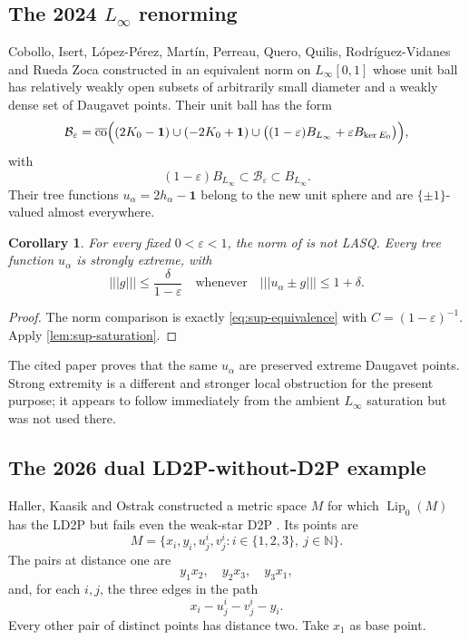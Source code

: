 \documentclass[11pt]{article}
\newtheorem{corollary}[theorem]{Corollary}
\newcommand{\N}{\mathbb N}
\newcommand{\eps}{\varepsilon}
\newcommand{\Lip}{\operatorname{Lip}}
\newcommand{\clco}{\overline{\operatorname{co}}}
\newcommand{\newnorm}[1]{\left\lvert\!\left\lvert\!\left\lvert #1\right\rvert\!\right\rvert\!\right\rvert}
\begin{document}
\subsection{The 2024 $L_\infty$ renorming}

Cobollo, Isert, L\'opez-P\'erez, Mart\'in, Perreau, Quero, Quilis, Rodr\'iguez-Vidanes and Rueda Zoca constructed in \cite{CobolloEtAl2024} an equivalent norm on $L_\infty[0,1]$ whose unit ball has relatively weakly open subsets of arbitrarily small diameter and a weakly dense set of Daugavet points.  Their unit ball has the form
\[
 \mathcal B_\eps=\clco\Bigl(
 (2K_0-\mathbf1)\cup(-2K_0+\mathbf1)
 \cup\bigl((1-\eps)B_{L_\infty}+\eps B_{\ker E_0}\bigr)
 \Bigr),
\]
with
\[
 (1-\eps)B_{L_\infty}\subset\mathcal B_\eps\subset B_{L_\infty}.
\]
Their tree functions $u_\alpha=2h_\alpha-\mathbf1$ belong to the new unit sphere and are $\{\pm1\}$-valued almost everywhere.

\begin{corollary}
\label{cor:cobollo-not-lasq}
For every fixed $0<\eps<1$, the norm of \cite[Theorem~1.3]{CobolloEtAl2024} is not LASQ.  Every tree function $u_\alpha$ is strongly extreme, with
\[
 \newnorm{g}\le\frac{\delta}{1-\eps}
 \quad\text{whenever}\quad
 \newnorm{u_\alpha\pm g}\le1+\delta.
\]
\end{corollary}

\begin{proof}
The norm comparison is exactly \eqref{eq:sup-equivalence} with $C=(1-\eps)^{-1}$.  Apply \cref{lem:sup-saturation}.
\end{proof}

The cited paper proves that the same $u_\alpha$ are preserved extreme Daugavet points.  Strong extremity is a different and stronger local obstruction for the present purpose; it appears to follow immediately from the ambient $L_\infty$ saturation but was not used there.

\subsection{The 2026 dual LD2P-without-D2P example}

Haller, Kaasik and Ostrak constructed a metric space $M$ for which $\Lip_0(M)$ has the LD2P but fails even the weak-star D2P \cite[Example~5.2]{HallerKaasikOstrak2026}.  Its points are
\[
 M=\{x_i,y_i,u_j^i,v_j^i:i\in\{1,2,3\},\ j\in\N\}.
\]
The pairs at distance one are
\[
 y_1x_2,\quad y_2x_3,\quad y_3x_1,
\]
and, for each $i,j$, the three edges in the path
\[
 x_i-u_j^i-v_j^i-y_i.
\]
Every other pair of distinct points has distance two.  Take $x_1$ as base point.
\end{document}
